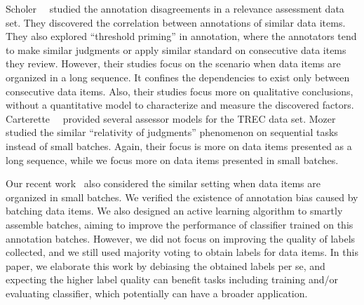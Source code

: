 Scholer~\etal~\cite{scholer:sigir2013,scholer:sigir2011} studied the annotation disagreements in 
a relevance assessment data set.  
They discovered the correlation between annotations of similar data items.  %
They also explored ``threshold priming'' in annotation, 
where the annotators tend to make similar judgments or apply similar standard on consecutive data items they review. 
However, their studies focus on the scenario when data items are organized in a long sequence.  
It confines the dependencies to exist only between consecutive data items.  
Also, their studies focus more on qualitative conclusions, without a quantitative model to characterize and measure the discovered factors.  
Carterette~\etal~\cite{carterette:effect2010} provided several assessor models for the TREC data set.  
Mozer~\etal~\cite{mozer:nips2010} studied the similar ``relativity of
judgments'' phenomenon on sequential tasks instead of small batches.  
Again, their focus is more on data items presented as a long sequence, while we focus more on data items presented in small batches.  

Our recent work~\cite{zhuang:wsdm2015} also considered the similar setting when data items are organized in small batches.  
We verified the existence of annotation bias caused by batching data items.  
We also designed an active learning algorithm to smartly assemble batches, 
aiming to improve the performance of classifier trained on this annotation batches.  
However, we did not focus on improving the quality of labels collected, 
and we still used majority voting to obtain labels for data items.  
In this paper, we elaborate this work by debiasing the obtained labels per se, 
and expecting the higher label quality can benefit tasks including training and/or evaluating classifier, 
which potentially can have a broader application.  

